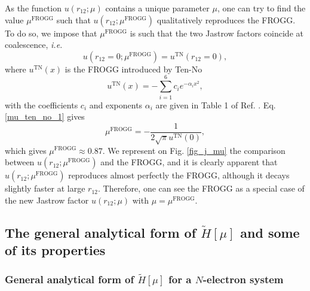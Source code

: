 \documentclass[aip,jcp,reprint,noshowkeys,superscriptaddress,twocolumn]{revtex4-1}
\newcommand{\mfrogg}[0]{\mu^\text{FROGG}}
\begin{document}
As the function $u(r_{12};\mu)$ contains a unique parameter $\mu$, one can try to find the value $\mfrogg$ such that 
$u(r_{12};\mfrogg)$ qualitatively reproduces the FROGG. 
To do so, we impose that $\mfrogg$ is such that the two Jastrow factors coincide at coalescence, \textit{i.e.}  
\begin{equation}
 \label{mu_ten_no_1}
u(r_{12}=0;\mfrogg) = u^{\text{TN}}(r_{12}=0), 
\end{equation}
where $ u^{\text{TN}}(x)$ is the FROGG introduced by Ten-No
\begin{equation}
 \label{eq_frogg}
 u^{\text{TN}}(x) = -\sum_{i=1}^6 c_i e^{-\alpha_i x^2 },
\end{equation}
with the coefficients $c_i$ and exponents $\alpha_i$ are given in Table 1 of Ref. . 
Eq. \eqref{mu_ten_no_1} gives 
\begin{equation}
 \label{mu_ten_no_2}
 \mfrogg = -\frac{1}{2\sqrt{\pi}u^{\text{TN}}(0)},
\end{equation}
which gives $\mfrogg\approx0.87$. 
We represent on Fig. \ref{fig_j_mu} the comparison between $u(r_{12};\mfrogg)$ and the FROGG, and it is clearly apparent  that $u(r_{12};\mfrogg)$ reproduces almost perfectly the FROGG, although it decays slightly faster at large $r_{12}$. Therefore, one can see the FROGG as a special case of the new Jastrow factor $u(r_{12};\mu)$ with $\mu = \mfrogg$. 

\subsection{The general analytical form of  $\tilde{H}[\mu]$ and some of its properties}
\label{sec:ht_general}
\subsubsection{General analytical form of $\tilde{H}[\mu]$ for a $N$-electron system}
\end{document}
